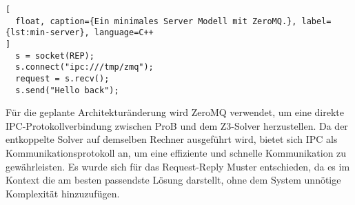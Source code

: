 \begin{lstlisting}[
  float, caption={Ein minimales Server Modell mit ZeroMQ.}, label={lst:min-server}, language=C++
]
  s = socket(REP);
  s.connect("ipc:///tmp/zmq");
  request = s.recv();
  s.send("Hello back");
\end{lstlisting}
\FloatBarrier

Für die geplante Architekturänderung wird ZeroMQ verwendet, um eine direkte IPC-Protokollverbindung zwischen ProB und dem Z3-Solver herzustellen.
Da der entkoppelte Solver auf demselben Rechner ausgeführt wird, bietet sich IPC als Kommunikationsprotokoll an, um eine effiziente und schnelle Kommunikation zu gewährleisten.
Es wurde sich für das Request-Reply Muster entschieden, da es im Kontext die am besten passendste Lösung darstellt,
ohne dem System unnötige Komplexität hinzuzufügen.
